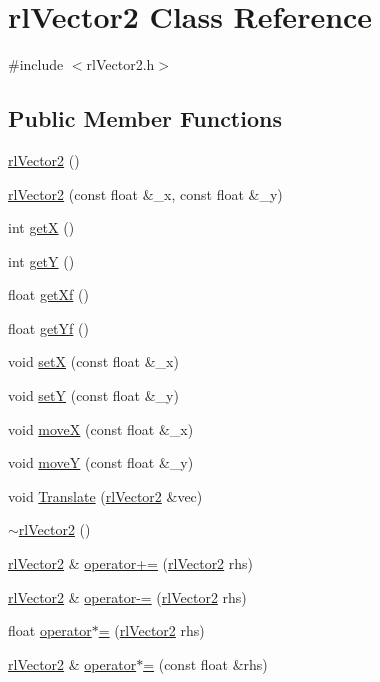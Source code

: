 \hypertarget{classrl_vector2}{}\section{rl\+Vector2 Class Reference}
\label{classrl_vector2}


{\ttfamily \#include $<$rl\+Vector2.\+h$>$}

\subsection*{Public Member Functions}
\begin{DoxyCompactItemize}
\item 
\hyperlink{classrl_vector2_ad24b73b97ca9d284c1b844cdff2005ec}{rl\+Vector2} ()
\item 
\hyperlink{classrl_vector2_ac3dca75f3619925b2e7ddc33de1581f4}{rl\+Vector2} (const float \&\+\_\+x, const float \&\+\_\+y)
\item 
int \hyperlink{classrl_vector2_a1e511a0a9b2e27b5b679fe7bcd45aedc}{getX} ()
\item 
int \hyperlink{classrl_vector2_a324e941ccfacf8781d0dbe738cb1ff55}{getY} ()
\item 
float \hyperlink{classrl_vector2_accdeeaa5df6f7c9cd1a05c098c2576ee}{get\+Xf} ()
\item 
float \hyperlink{classrl_vector2_a75d700713286f32ea10657554eb74c88}{get\+Yf} ()
\item 
void \hyperlink{classrl_vector2_a0f8dfb308f9af458045bf3fafbb4ff91}{setX} (const float \&\+\_\+x)
\item 
void \hyperlink{classrl_vector2_a2237e126110f38dae58cd9f94b1dcd0e}{setY} (const float \&\+\_\+y)
\item 
void \hyperlink{classrl_vector2_acce19919e9ff7b8d871aab5ca23415d3}{moveX} (const float \&\+\_\+x)
\item 
void \hyperlink{classrl_vector2_a22c28c20c86711d8c43d1dcbc7b20636}{moveY} (const float \&\+\_\+y)
\item 
void \hyperlink{classrl_vector2_afa9208eef1c7546011a7ded9840059ff}{Translate} (\hyperlink{classrl_vector2}{rl\+Vector2} \&vec)
\item 
\hyperlink{classrl_vector2_a278eda16b99c1f677a1cd6542a727ae7}{$\sim$rl\+Vector2} ()
\item 
\hyperlink{classrl_vector2}{rl\+Vector2} \& \hyperlink{classrl_vector2_a0c7daa76b39d3e97059bb5267504ed3c}{operator+=} (\hyperlink{classrl_vector2}{rl\+Vector2} rhs)
\item 
\hyperlink{classrl_vector2}{rl\+Vector2} \& \hyperlink{classrl_vector2_aaa3219871659472ddc5824410aaa40e2}{operator-\/=} (\hyperlink{classrl_vector2}{rl\+Vector2} rhs)
\item 
float \hyperlink{classrl_vector2_a42f1d9dbdda703d0a39d1da6692c6af0}{operator$\ast$=} (\hyperlink{classrl_vector2}{rl\+Vector2} rhs)
\item 
\hyperlink{classrl_vector2}{rl\+Vector2} \& \hyperlink{classrl_vector2_a06494db8211867fb87c23d8a27a1ec8d}{operator$\ast$=} (const float \&rhs)
\end{DoxyCompactItemize}
